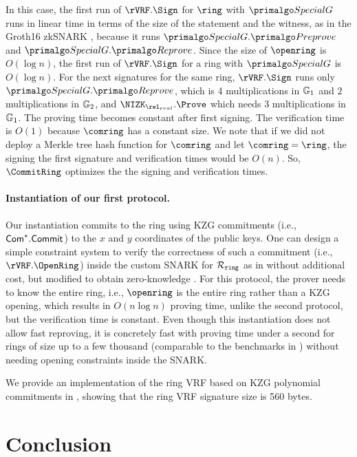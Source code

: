 In this case, the first run of $\rVRF.\Sign$ for $\ring$ with $ \SpecialG $ runs in linear time in terms of the size of the statement and the witness, as in the Groth16 zkSNARK \cite{Groth16}, because it runs $ \SpecialG.\Preprove $ and $ \SpecialG.\Reprove $. Since the size of $ \openring $ is
$ O(\log n) $, the first run of $\rVRF.\Sign$ for a ring with $ \SpecialG $ is $ O(\log n) $.
For the next signatures for the same ring,  $\rVRF.\Sign$  runs only  $\SpecialG.\Reprove$, which is 4 multiplications in $\mathbb{G}_1 $ and $2$ multiplications in $\mathbb{G}_2$, and  $\NIZK_{\rel_{eval}}.\Prove$ which needs  3 multiplications in $ \mathbb{G}_1 $.  The proving time becomes constant after first signing. 
The verification time is $ O(1) $ because $ \comring $ has a constant size.
We note that if we did not deploy a Merkle tree hash function for $ \comring $ and let $ \comring = \ring $, the signing the first signature and verification times would be $ O(n) $. So, $ \CommitRing $ optimizes the the signing and verification times.

\paragraph{Instantiation of our first protocol.}  Our instantiation commits to the ring using KZG commitments (i.e., $ \mathsf{Com}^*.\mathsf{Commit} $) to the $ x $ and $ y $ coordinates of the public keys.
One can design a simple constraint system to verify the correctness of such a commitment (i.e., $ \rVRF.\OpenRing $) inside the custom SNARK for $\mathcal{R}_{\mathtt{ring}}$ as in \cite{accountable} without additional cost, but  modified to obtain zero-knowledge \cite{plonk}.  For this protocol, the prover needs to know the entire ring, i.e., $\openring$ is the entire ring rather than a KZG opening, which results in $O(n \log n)$ proving time, unlike the second protocol, but the verification time is constant. Even though this instantiation  does not allow fast reproving,  it is concretely fast with proving time under a second for rings of size up to a few thousand (comparable to the benchmarks in \cite{accountable}) without needing opening constraints inside the SNARK. 

We provide an implementation of the ring VRF based on KZG polynomial commitments in \cite{implementation}, showing that the ring VRF signature size is 560 bytes.

\section{Conclusion}\label{sec:conclusion}

